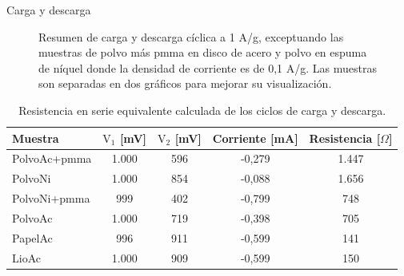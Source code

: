 \documentclass{beamer}
\newcommand{\plotscale}{0.5}
\newcommand{\mPolvoAcero}{PolvoAc }
\newcommand{\mPolvoAceroPMMA}{PolvoAc+pmma }
\newcommand{\mPapelAcero}{PapelAc }
\newcommand{\mLiofilizadoAcero}{LioAc }
\newcommand{\mPolvoNiquel}{PolvoNi }
\newcommand{\mPolvoNiquelPMMA}{PolvoNi+pmma }
\begin{document}
\begin{frame}{Carga y descarga}
\begin{figure}[h!]
\begin{subfigure}{0.4\textwidth}
			\end{subfigure}
			\caption[Resumen de carga y descarga cíclica]{Resumen de carga y descarga cíclica a 1 A/g, exceptuando las muestras de polvo más pmma en disco de acero y polvo en espuma de níquel donde la densidad de corriente es de 0,1 A/g. Las muestras son separadas en dos gráficos para mejorar su visualización.}
			\label{fig:resumen_ccd}
		\end{figure}
	\end{frame}

	\begin{frame}
		\begin{table}[h!]
			\centering
			\caption{Resistencia en serie equivalente calculada de los ciclos de carga y descarga.}
			\begin{tabular}{l c c c c}
				Muestra	&	$\mathrm{V_1}$ [mV]	&	$\mathrm{V_2}$ [mV]	&	Corriente [mA]	&	Resistencia [$\Omega$]	\\
				\hline
				\mPolvoAceroPMMA		&	1.000	&	596	&	-0,279	&	1.447	\\
				\mPolvoNiquel			&	1.000	&	854	&	-0,088	&	1.656	\\
				\mPolvoNiquelPMMA		&	999		&	402	&	-0,799	&	748		\\
				\mPolvoAcero			&	1.000	&	719	&	-0,398	&	705		\\
				\mPapelAcero			&	996		&	911	&	-0,599	&	141		\\
				\mLiofilizadoAcero		&	1.000	&	909	&	-0,599	&	150		\\
			\end{tabular}
			\label{tab:esr}
		\end{table}
	\end{frame}
\end{document}
